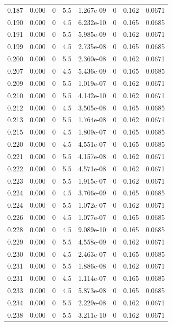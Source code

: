 \documentclass[preview]{standalone}
\begin{document}
{{{\begin{tabular}{L{1.2cm}C{1.2cm} C{0.3cm}C{0.5cm} C{1.4cm}C{1.4cm} C{1.4cm}C{1.4cm}}
  0.187  &  0.000  & 0     & 5.5 &  1.267e-09  & 0  & 0.162 &  0.0671   \\ 
  0.190  &  0.000  & 0     & 4.5 &  6.232e-10  & 0  & 0.165 &  0.0685   \\ 
  0.191  &  0.000  & 0     & 5.5 &  5.985e-09  & 0  & 0.162 &  0.0671   \\ 
  0.199  &  0.000  & 0     & 4.5 &  2.735e-08  & 0  & 0.165 &  0.0685   \\ 
  0.200  &  0.000  & 0     & 5.5 &  2.360e-08  & 0  & 0.162 &  0.0671   \\ 
  0.207  &  0.000  & 0     & 4.5 &  5.436e-09  & 0  & 0.165 &  0.0685   \\ 
  0.209  &  0.000  & 0     & 5.5 &  1.019e-07  & 0  & 0.162 &  0.0671   \\ 
  0.210  &  0.000  & 0     & 5.5 &  4.142e-10  & 0  & 0.162 &  0.0671   \\ 
  0.212  &  0.000  & 0     & 4.5 &  3.505e-08  & 0  & 0.165 &  0.0685   \\ 
  0.213  &  0.000  & 0     & 5.5 &  1.764e-08  & 0  & 0.162 &  0.0671   \\ 
  0.215  &  0.000  & 0     & 4.5 &  1.809e-07  & 0  & 0.165 &  0.0685   \\ 
  0.220  &  0.000  & 0     & 4.5 &  4.551e-07  & 0  & 0.165 &  0.0685   \\ 
  0.221  &  0.000  & 0     & 5.5 &  4.157e-08  & 0  & 0.162 &  0.0671   \\ 
  0.222  &  0.000  & 0     & 5.5 &  4.571e-08  & 0  & 0.162 &  0.0671   \\ 
  0.223  &  0.000  & 0     & 5.5 &  1.915e-07  & 0  & 0.162 &  0.0671   \\ 
  0.224  &  0.000  & 0     & 4.5 &  3.766e-09  & 0  & 0.165 &  0.0685   \\ 
  0.224  &  0.000  & 0     & 5.5 &  1.072e-07  & 0  & 0.162 &  0.0671   \\ 
  0.226  &  0.000  & 0     & 4.5 &  1.077e-07  & 0  & 0.165 &  0.0685   \\ 
  0.228  &  0.000  & 0     & 4.5 &  9.089e-10  & 0  & 0.165 &  0.0685   \\ 
  0.229  &  0.000  & 0     & 5.5 &  4.558e-09  & 0  & 0.162 &  0.0671   \\ 
  0.230  &  0.000  & 0     & 4.5 &  2.463e-07  & 0  & 0.165 &  0.0685   \\ 
  0.231  &  0.000  & 0     & 5.5 &  1.886e-08  & 0  & 0.162 &  0.0671   \\ 
  0.231  &  0.000  & 0     & 4.5 &  1.114e-07  & 0  & 0.165 &  0.0685   \\ 
  0.233  &  0.000  & 0     & 4.5 &  5.873e-08  & 0  & 0.165 &  0.0685   \\ 
  0.234  &  0.000  & 0     & 5.5 &  2.229e-08  & 0  & 0.162 &  0.0671   \\ 
  0.238  &  0.000  & 0     & 5.5 &  3.211e-10  & 0  & 0.162 &  0.0671   \\ 
\hline 
\end{tabular} 

}}}
\end{document}
